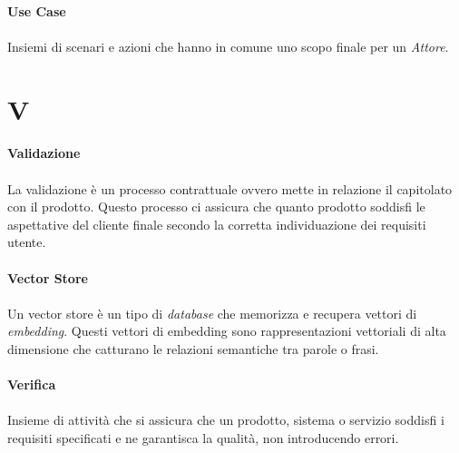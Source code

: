 \documentclass[10pt, a4paper]{article}
\begin{document}
\vspace{2em}
\paragraph{Use Case}\noindent\hrulefill
\paragraph{}Insiemi di scenari e azioni che hanno in comune uno scopo finale per un \textit{Attore\pg}.

\newpage
\section{V}
\vspace{2em}
\paragraph{Validazione}\noindent\hrulefill
\paragraph{}La validazione è un processo contrattuale ovvero mette in relazione il capitolato con il prodotto. Questo processo ci assicura che quanto prodotto soddisfi le aspettative del cliente finale secondo la corretta individuazione dei requisiti utente.

\vspace{2em}
\paragraph{Vector Store}\noindent\hrulefill
\paragraph{}Un vector store è un tipo di \textit{database\pg} che memorizza e recupera vettori di \textit{embedding\pg}. Questi vettori di embedding sono rappresentazioni vettoriali di alta dimensione che catturano le relazioni semantiche tra parole o frasi.

\vspace{2em}
\paragraph{Verifica}\noindent\hrulefill
\paragraph{}Insieme di attività che si assicura che un prodotto, sistema o servizio soddisfi i requisiti specificati e ne garantisca la qualità, non introducendo errori.
\end{document}
